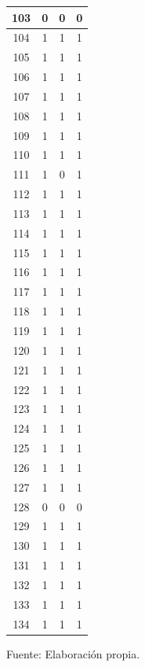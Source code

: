 \begin{longtable}[c]{|c|c|c|c|}
103 & 0 & 0 & 0 \\ \hline
\rowcolor[HTML]{81DAF5} 
104 & 1 & 1 & 1 \\ \hline
\rowcolor[HTML]{81DAF5} 
105 & 1 & 1 & 1 \\ \hline
\rowcolor[HTML]{81DAF5} 
106 & 1 & 1 & 1 \\ \hline
\rowcolor[HTML]{81DAF5} 
107 & 1 & 1 & 1 \\ \hline
\rowcolor[HTML]{81DAF5} 
108 & 1 & 1 & 1 \\ \hline
\rowcolor[HTML]{81DAF5} 
109 & 1 & 1 & 1 \\ \hline
\rowcolor[HTML]{81DAF5} 
110 & 1 & 1 & 1 \\ \hline
\rowcolor[HTML]{81DAF5} 
111 & 1 & 0 & 1 \\ \hline
\rowcolor[HTML]{81DAF5} 
112 & 1 & 1 & 1 \\ \hline
\rowcolor[HTML]{81DAF5} 
113 & 1 & 1 & 1 \\ \hline
\rowcolor[HTML]{81DAF5} 
114 & 1 & 1 & 1 \\ \hline
\rowcolor[HTML]{81DAF5} 
115 & 1 & 1 & 1 \\ \hline
\rowcolor[HTML]{81DAF5} 
116 & 1 & 1 & 1 \\ \hline
\rowcolor[HTML]{81DAF5} 
117 & 1 & 1 & 1 \\ \hline
\rowcolor[HTML]{81DAF5} 
118 & 1 & 1 & 1 \\ \hline
\rowcolor[HTML]{81DAF5} 
119 & 1 & 1 & 1 \\ \hline
\rowcolor[HTML]{81DAF5} 
120 & 1 & 1 & 1 \\ \hline
\rowcolor[HTML]{81DAF5} 
121 & 1 & 1 & 1 \\ \hline
\rowcolor[HTML]{81DAF5} 
122 & 1 & 1 & 1 \\ \hline
\rowcolor[HTML]{81DAF5} 
123 & 1 & 1 & 1 \\ \hline
\rowcolor[HTML]{81DAF5} 
124 & 1 & 1 & 1 \\ \hline
\rowcolor[HTML]{81DAF5} 
125 & 1 & 1 & 1 \\ \hline
\rowcolor[HTML]{81DAF5} 
126 & 1 & 1 & 1 \\ \hline
\rowcolor[HTML]{81DAF5} 
127 & 1 & 1 & 1 \\ \hline
\rowcolor[HTML]{81DAF5} 
128 & 0 & 0 & 0 \\ \hline
\rowcolor[HTML]{81DAF5} 
129 & 1 & 1 & 1 \\ \hline
\rowcolor[HTML]{81DAF5} 
130 & 1 & 1 & 1 \\ \hline
\rowcolor[HTML]{81DAF5} 
131 & 1 & 1 & 1 \\ \hline
\rowcolor[HTML]{81DAF5} 
132 & 1 & 1 & 1 \\ \hline
\rowcolor[HTML]{81DAF5} 
133 & 1 & 1 & 1 \\ \hline
\rowcolor[HTML]{81DAF5} 
134 & 1 & 1 & 1 \\ \hline
\end{longtable}
\begin{center}
Fuente: Elaboración propia.
\end{center}

